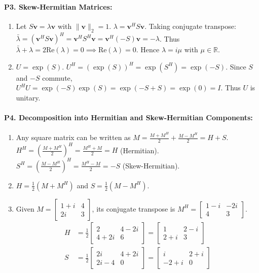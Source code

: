 \paragraph{P3. Skew-Hermitian Matrices:}
\begin{enumerate}[label=(\alph*)]
    \item Let $S\mathbf{v} = \lambda \mathbf{v}$ with $\|\mathbf{v}\|_2 = 1$. $\lambda = \mathbf{v}^H S \mathbf{v}$.
    Taking conjugate transpose: $\bar{\lambda} = (\mathbf{v}^H S \mathbf{v})^H = \mathbf{v}^H S^H \mathbf{v} = \mathbf{v}^H (-S)\mathbf{v} = -\lambda$.
    Thus $\bar{\lambda} + \lambda = 2\text{Re}(\lambda) = 0 \implies \text{Re}(\lambda) = 0$. Hence $\lambda = i\mu$ with $\mu \in \mathbb{R}$.
    \item $U = \exp(S)$. $U^H = (\exp(S))^H = \exp(S^H) = \exp(-S)$.
    Since $S$ and $-S$ commute, $U^H U = \exp(-S)\exp(S) = \exp(-S + S) = \exp(0) = I$. Thus $U$ is unitary.
\end{enumerate}

\paragraph{P4. Decomposition into Hermitian and Skew-Hermitian Components:}
\begin{enumerate}[label=(\alph*)]
    \item Any square matrix can be written as $M = \frac{M + M^H}{2} + \frac{M - M^H}{2} = H + S$.
    $H^H = \left(\frac{M + M^H}{2}\right)^H = \frac{M^H + M}{2} = H$ (Hermitian).
    $S^H = \left(\frac{M - M^H}{2}\right)^H = \frac{M^H - M}{2} = -S$ (Skew-Hermitian).
    \item $H = \frac{1}{2}(M + M^H)$ and $S = \frac{1}{2}(M - M^H)$.
    \item Given $M = \begin{bmatrix} 1+i & 4 \\ 2i & 3 \end{bmatrix}$, its conjugate transpose is $M^H = \begin{bmatrix} 1-i & -2i \\ 4 & 3 \end{bmatrix}$.
    \begin{align*}
    H &= \frac{1}{2} \begin{bmatrix} 2 & 4-2i \\ 4+2i & 6 \end{bmatrix} = \begin{bmatrix} 1 & 2-i \\ 2+i & 3 \end{bmatrix} \\
    S &= \frac{1}{2} \begin{bmatrix} 2i & 4+2i \\ 2i-4 & 0 \end{bmatrix} = \begin{bmatrix} i & 2+i \\ -2+i & 0 \end{bmatrix}
    \end{align*}
\end{enumerate}

